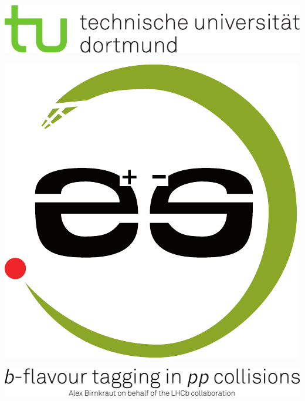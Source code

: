 \documentclass[a0poster,portrait,final,movebody=-5pt]{baposter}
\begin{document}
\begin{poster}
{\begin{minipage}[c]{0.20\textwidth}
\end{minipage}
\begin{minipage}[c]{0.20\textwidth}
\vspace{-1.6cm}\hspace{-2.5cm}
\includegraphics[height=0.3\textwidth]{figures/tud_logo_cmyk.pdf}
\end{minipage}
\begin{minipage}[c]{0.20\textwidth}
\vspace{-1.6cm}\hspace{3.3cm}
\includegraphics[height=0.3\textwidth]{figures/e5logo_green.pdf}
\end{minipage}
\newline
\begin{minipage}{0.8\textwidth}\vspace{2.3cm}\hspace{-19.8cm}
\includegraphics[height=0.077\textwidth]{figures/title2.pdf}
\vspace{0.2cm}
\end{minipage}
}
{}

{}


\end{poster}
\end{document}
